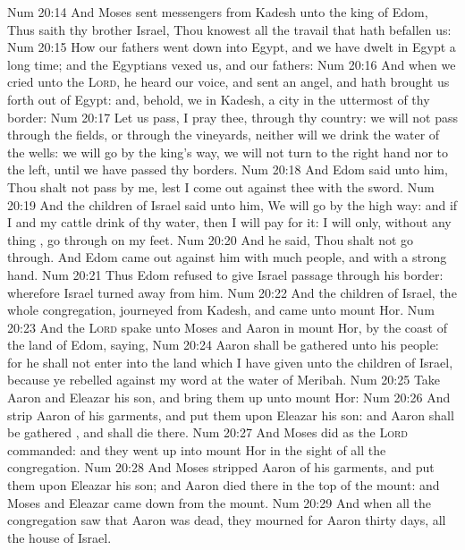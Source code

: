 \vs Num 20:14 And Moses sent messengers from Kadesh unto the king of Edom, Thus saith thy brother Israel, Thou knowest all the travail that hath befallen us:
\vs Num 20:15 How our fathers went down into Egypt, and we have dwelt in Egypt a long time; and the Egyptians vexed us, and our fathers:
\vs Num 20:16 And when we cried unto the \textsc{Lord}, he heard our voice, and sent an angel, and hath brought us forth out of Egypt: and, behold, we  in Kadesh, a city in the uttermost of thy border:
\vs Num 20:17 Let us pass, I pray thee, through thy country: we will not pass through the fields, or through the vineyards, neither will we drink  the water of the wells: we will go by the king's  way, we will not turn to the right hand nor to the left, until we have passed thy borders.
\vs Num 20:18 And Edom said unto him, Thou shalt not pass by me, lest I come out against thee with the sword.
\vs Num 20:19 And the children of Israel said unto him, We will go by the high way: and if I and my cattle drink of thy water, then I will pay for it: I will only, without  any thing , go through on my feet.
\vs Num 20:20 And he said, Thou shalt not go through. And Edom came out against him with much people, and with a strong hand.
\vs Num 20:21 Thus Edom refused to give Israel passage through his border: wherefore Israel turned away from him.
\vs Num 20:22 And the children of Israel,  the whole congregation, journeyed from Kadesh, and came unto mount Hor.
\vs Num 20:23 And the \textsc{Lord} spake unto Moses and Aaron in mount Hor, by the coast of the land of Edom, saying,
\vs Num 20:24 Aaron shall be gathered unto his people: for he shall not enter into the land which I have given unto the children of Israel, because ye rebelled against my word at the water of Meribah.
\vs Num 20:25 Take Aaron and Eleazar his son, and bring them up unto mount Hor:
\vs Num 20:26 And strip Aaron of his garments, and put them upon Eleazar his son: and Aaron shall be gathered , and shall die there.
\vs Num 20:27 And Moses did as the \textsc{Lord} commanded: and they went up into mount Hor in the sight of all the congregation.
\vs Num 20:28 And Moses stripped Aaron of his garments, and put them upon Eleazar his son; and Aaron died there in the top of the mount: and Moses and Eleazar came down from the mount.
\vs Num 20:29 And when all the congregation saw that Aaron was dead, they mourned for Aaron thirty days,  all the house of Israel.
